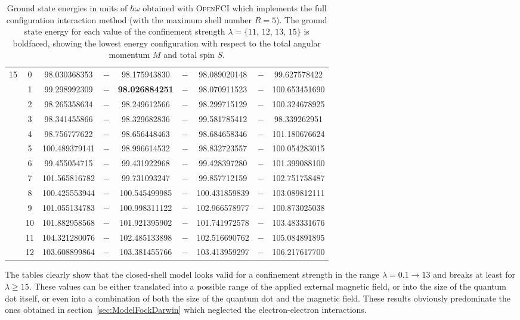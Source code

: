 \begin{table}[ht]
{\begin{tabular}{c|c|c|c|c|c|c|c|c}
\hline                    %
\multirow{13}{*}{15} & 0 & 98.030368353 & $-$ & 98.175943830 & $-$ & 98.089020148 & $-$ & 99.627578422 \\
& 1 & 99.298992309 & $-$ & \textbf{98.026884251} & $-$ & 98.070911523 & $-$ & 100.653451690 \\
& 2 & 98.265358634 & $-$ & 98.249612566 & $-$ & 98.299715129 & $-$ & 100.324678925 \\
& 3 & 98.341455866 & $-$ & 98.329682836 & $-$ & 99.581785412 & $-$ & 98.339262951 \\
& 4 & 98.756777622 & $-$ & 98.656448463 & $-$ & 98.684658346 & $-$ & 101.180676624 \\
& 5 & 100.489379141 & $-$ & 98.996614532 & $-$ & 98.832723557 & $-$ & 100.054283015 \\
& 6 & 99.455054715 & $-$ & 99.431922968 & $-$ & 99.428397280 & $-$ & 101.399088100 \\
& 7 & 101.565816782 & $-$ & 99.731093247 & $-$ & 99.857712159 & $-$ & 102.751758487 \\
& 8 & 100.425553944 & $-$ & 100.545499985 & $-$ & 100.431859839 & $-$ & 103.089812111 \\
& 9 & 101.055134783 & $-$ & 100.998311122 & $-$ & 102.966578977 & $-$ & 100.873025038 \\
& 10 & 101.882958568 & $-$ & 101.921395902 & $-$ & 101.741972578 & $-$ & 103.483331676 \\
& 11 & 104.321280076 & $-$ & 102.485133898 & $-$ & 102.516690762 & $-$ & 105.084891895 \\
& 12 & 103.608899864 & $-$ & 103.381455766 & $-$ & 103.413959297 & $-$ & 106.217617700 \\
\hline                    %
\toprule[1pt]
\end{tabular}
}
 \caption{Ground state energies in units of $\hbar \omega$ obtained with \textsc{OpenFCI} which implements the full configuration interaction method (with the maximum shell number $R=5$). The ground state energy for each value of the confinement strength $\lambda=\{11,\,12,\,13,\,15\}$ is boldfaced, showing the lowest energy configuration with respect to the total angular momentum $M$ and total spin $S$.}
\label{table:GSfci3} 
\end{table} 
\clearpage

The tables clearly show that the closed-shell model looks valid for a confinement strength in the range $\lambda=0.1 \rightarrow 13$ and breaks at least for $\lambda \geq 15$. These values can be either translated into a possible range of the applied external magnetic field, or into the size of the quantum dot itself, or even into a combination of both the size of the quantum dot and the magnetic field.
These results obviously predominate the ones obtained in section~\ref{sec:ModelFockDarwin} which neglected the electron-electron 
interactions.

